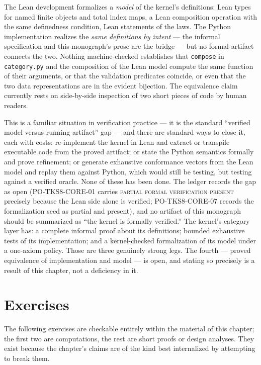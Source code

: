 The Lean development formalizes a \emph{model} of the kernel's definitions:
Lean types for named finite objects and total index maps, a Lean composition
operation with the same definedness condition, Lean statements of the laws.
The Python implementation realizes the \emph{same definitions by intent} ---
the informal specification and this monograph's prose are the bridge --- but
no formal artifact connects the two. Nothing machine-checked establishes
that \texttt{compose} in \texttt{category.py} and the composition of the
Lean model compute the same function of their arguments, or that the
validation predicates coincide, or even that the two data representations
are in the evident bijection. The equivalence claim currently rests on
side-by-side inspection of two short pieces of code by human readers.

This is a familiar situation in verification practice --- it is the standard
``verified model versus running artifact'' gap --- and there are standard
ways to close it, each with costs: re-implement the kernel in Lean and
extract or transpile executable code from the proved artifact; or state the
Python semantics formally and prove refinement; or generate exhaustive
conformance vectors from the Lean model and replay them against Python,
which would still be testing, but testing against a verified oracle. None of
these has been done. The ledger records the gap as open
(PO-TKS8-CORE-01 carries \textsc{partial formal verification present}
precisely because the Lean side alone is verified; PO-TKS8-CORE-07 records
the formalization seed as partial and present), and no artifact of this
monograph should be summarized as ``the kernel is formally verified.'' The
kernel's category layer has: a complete informal proof about its
definitions; bounded exhaustive tests of its implementation; and a
kernel-checked formalization of its model under a one-axiom policy. Those
are three genuinely strong legs. The fourth --- proved equivalence of
implementation and model --- is open, and stating so precisely is a result
of this chapter, not a deficiency in it.

\section{Exercises}
\label{ch04:sec:exercises}

The following exercises are checkable entirely within the material of this
chapter; the first two are computations, the rest are short proofs or
design analyses. They exist because the chapter's claims are of the kind
best internalized by attempting to break them.

